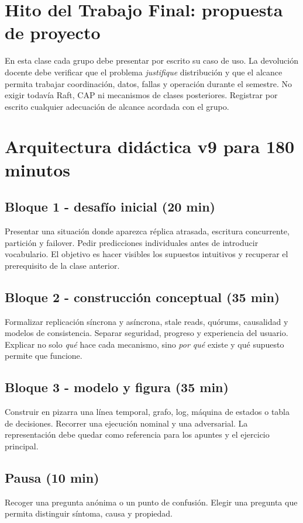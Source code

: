 \documentclass[variant=docente,cover=institutional,mode=screen]{ua-engineering-v6-article}
\begin{document}
\section{Hito del Trabajo Final: propuesta de proyecto}
En esta clase cada grupo debe presentar por escrito su caso de uso. La devolución docente debe verificar que el problema \emph{justifique} distribución y que el alcance permita trabajar coordinación, datos, fallas y operación durante el semestre. No exigir todavía Raft, CAP ni mecanismos de clases posteriores. Registrar por escrito cualquier adecuación de alcance acordada con el grupo.

\section{Arquitectura didáctica v9 para 180 minutos}
\subsection*{Bloque 1 - desafío inicial (20 min)}
Presentar una situación donde aparezca réplica atrasada, escritura concurrente, partición y failover. Pedir predicciones individuales antes de introducir vocabulario. El objetivo es hacer visibles los supuestos intuitivos y recuperar el prerequisito de la clase anterior.

\subsection*{Bloque 2 - construcción conceptual (35 min)}
Formalizar replicación síncrona y asíncrona, stale reads, quórums, causalidad y modelos de consistencia. Separar seguridad, progreso y experiencia del usuario. Explicar no solo \emph{qué} hace cada mecanismo, sino \emph{por qué} existe y qué supuesto permite que funcione.

\subsection*{Bloque 3 - modelo y figura (35 min)}
Construir en pizarra una línea temporal, grafo, log, máquina de estados o tabla de decisiones. Recorrer una ejecución nominal y una adversarial. La representación debe quedar como referencia para los apuntes y el ejercicio principal.

\subsection*{Pausa (10 min)}
Recoger una pregunta anónima o un punto de confusión. Elegir una pregunta que permita distinguir síntoma, causa y propiedad.
\end{document}
